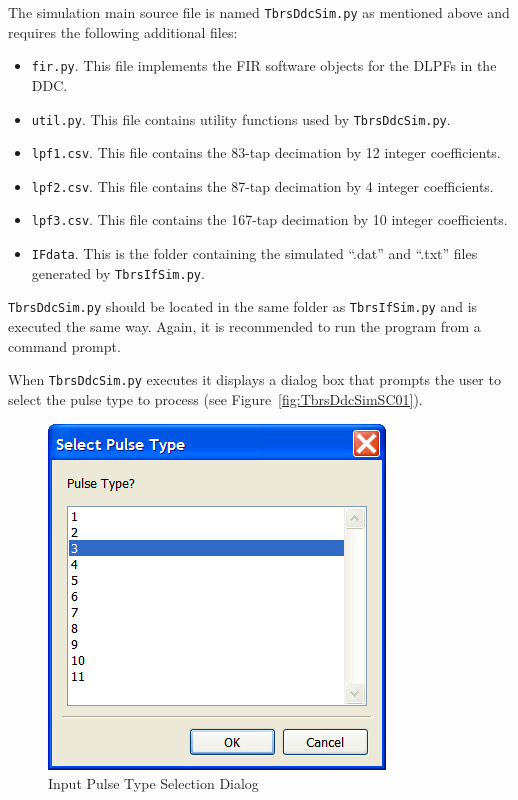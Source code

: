 \documentclass[12pt,english]{article}
\begin{document}
The simulation main source file is named \texttt{TbrsDdcSim.py} as
mentioned above and requires the following additional files:
\begin{itemize}

\item \texttt{fir.py}. This file implements the FIR software objects
for the DLPFs in the DDC.

\item \texttt{util.py}. This file contains utility functions used by
\texttt{TbrsDdcSim.py}.

\item \texttt{lpf1.csv}. This file contains the 83-tap decimation by 12
integer coefficients.

\item \texttt{lpf2.csv}. This file contains the 87-tap decimation by 4
integer coefficients.

\item \texttt{lpf3.csv}. This file contains the 167-tap decimation by 10
integer coefficients.

\item \texttt{IFdata}. This is the folder containing the simulated
``.dat'' and ``.txt'' files generated by \texttt{TbrsIfSim.py}.

\end{itemize}

\texttt{TbrsDdcSim.py} should be located in the same folder as
\texttt{TbrsIfSim.py} and is executed the same way. Again, it is
recommended to run the program from a command prompt.

When \texttt{TbrsDdcSim.py} executes it displays a dialog box that
prompts the user to select the pulse type to process (see
Figure~\vref{fig:TbrsDdcSimSC01}).
\begin{figure}[ht]
  \noindent \begin{centering}
  \includegraphics{TbrsDdcSimSC01.png}\medskip{}
  \caption{Input Pulse Type Selection Dialog}
  \label{fig:TbrsDdcSimSC01}
  \par \end{centering}
\end{figure}
\end{document}

